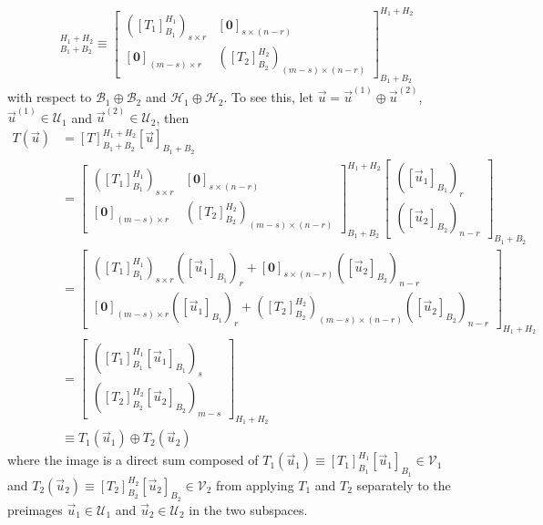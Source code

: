 \begin{align*}
[T]_{B_1 + B_2}^{H_1 + H_2}
\equiv
\begin{bmatrix}
([T_1]_{B_1}^{H_1})_{s \times r} & [\textbf{0}]_{s \times (n-r)} \\
[\textbf{0}]_{(m-s) \times r} & ([T_2]_{B_2}^{H_2})_{(m-s) \times (n-r)}
\end{bmatrix}_{B_1 + B_2}^{H_1 + H_2}
\end{align*}
with respect to $\mathcal{B}_1 \oplus \mathcal{B}_2$ and $\mathcal{H}_1 \oplus \mathcal{H}_2$. To see this, let $\vec{u} = \vec{u}^{(1)} \oplus \vec{u}^{(2)}$, $\vec{u}^{(1)} \in \mathcal{U}_1$ and $\vec{u}^{(2)} \in \mathcal{U}_2$, then
\begin{align*}
T(\vec{u}) &= [T]_{B_1 + B_2}^{H_1 + H_2}[\vec{u}]_{B_1 + B_2} \\ 
&= \begin{bmatrix}
([T_1]_{B_1}^{H_1})_{s \times r} & [\textbf{0}]_{s \times (n-r)} \\
[\textbf{0}]_{(m-s) \times r} & ([T_2]_{B_2}^{H_2})_{(m-s) \times (n-r)}
\end{bmatrix}_{B_1 + B_2}^{H_1 + H_2}
\begin{bmatrix}
([\vec{u}_1]_{B_1})_r \\
([\vec{u}_2]_{B_2})_{n-r}
\end{bmatrix}_{B_1 + B_2} \\
&= 
\begin{bmatrix}
([T_1]_{B_1}^{H_1})_{s \times r}([\vec{u}_1]_{B_1})_r + [\textbf{0}]_{s \times (n-r)}([\vec{u}_2]_{B_2})_{n-r} \\
[\textbf{0}]_{(m-s) \times r}([\vec{u}_1]_{B_1})_r + ([T_2]_{B_2}^{H_2})_{(m-s) \times (n-r)}([\vec{u}_2]_{B_2})_{n-r}
\end{bmatrix}_{H_1 + H_2} \\
&= 
\begin{bmatrix}
([T_1]_{B_1}^{H_1}[\vec{u}_1]_{B_1})_s \\
([T_2]_{B_2}^{H_2}[\vec{u}_2]_{B_2})_{m-s}
\end{bmatrix}_{H_1 + H_2} \\
&\equiv
T_1(\vec{u}_1) \oplus T_2(\vec{u}_2)
\end{align*}
where the image is a direct sum composed of $T_1(\vec{u}_1) \equiv [T_1]_{B_1}^{H_1}[\vec{u}_1]_{B_1} \in \mathcal{V}_1$ and $T_2(\vec{u}_2) \equiv [T_2]_{B_2}^{H_2}[\vec{u}_2]_{B_2} \in \mathcal{V}_2$ from applying $T_1$ and $T_2$ separately to the preimages $\vec{u}_1 \in \mathcal{U}_1$ and $\vec{u}_2 \in \mathcal{U}_2$ in the two subspaces.
